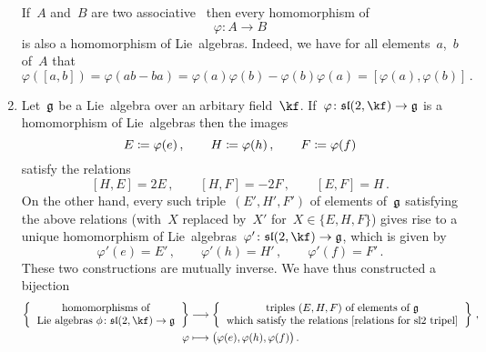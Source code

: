 \begin{examples}
\begin{enumerate}
      \label{algebra homomorphisms are lie algebra homomorphisms}
      If~$A$ and~$B$ are two associative~{\algebras{$\kf$}} then every homomorphism of~{\algebras{$\kf$}}
      \[
        \varphi \colon A \to B
      \]
      is also a homomorphism of Lie~algebras.
      Indeed, we have for all elements~$a$,~$b$ of~$A$ that
      \[
        \varphi([a,b])
        =
        \varphi(ab - ba)
        =
        \varphi(a) \varphi(b) - \varphi(b) \varphi(a)
        =
        [\varphi(a), \varphi(b)] \,.
      \]
    \item
      Let~$\mathfrak{g}$ be a Lie~algebra over an arbitary field~$\kf$.
      If~$\varphi \colon \sllie(2, \kf) \to \glie$ is a homomorphism of Lie~algebras then the images
      \[
        E \coloneqq \varphi(e)  \,,
        \qquad
        H \coloneqq \varphi(h)  \,,
        \qquad
        F \coloneqq \varphi(f)
      \]
      satisfy the relations
      \begin{equation}
        \label{relations for sl2 tripel}
        [H, E] = 2E  \,,
        \qquad
        [H, F] = -2F  \,,
        \qquad
        [E, F] = H \,.
      \end{equation}
      On the other hand, every such triple~$(E', H', F')$ of elements of~$\mathfrak{g}$ satisfying the above relations (with~$X$ replaced by~$X'$ for~$X \in \{ E, H, F \}$) gives rise to a unique homomorphism of Lie~algebras~$\varphi' \colon \sllie(2, \kf) \to \glie$, which is given by
      \[
        \varphi'(e) = E' \,,
        \qquad
        \varphi'(h) = H' \,,
        \qquad
        \varphi'(f) = F' \,.
      \] 
      These two constructions are mutually inverse.
      We have thus constructed a bijection
      \begin{align*}
        \left\{
          \begin{tabular}{c}
            homomorphisms of \\
            Lie~algebras~$\phi \colon \sllie(2, \kf) \to \glie$
          \end{tabular}
        \right\}
        &\to
        \left\{
          \begin{tabular}{c}
            triples $(E, H, F)$ of elements of~$\glie$ \\
            which satisfy the relations~\eqref{relations for sl2 tripel}
          \end{tabular}
        \right\} \,,
        \\
        \varphi
        &\mapsto
        \bigl( \varphi(e), \varphi(h), \varphi(f) \bigr) \,.
      \end{align*}
  \end{enumerate}
\end{examples}


